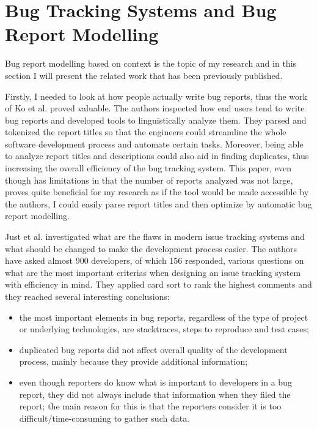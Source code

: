 \documentclass[11pt,english,twocolumn]{article}
\begin{document}
\section{Bug Tracking Systems and Bug Report Modelling}
\label{sec:bug-report}

Bug report modelling based on context is the topic of my research and in this
section I will present the related work that has been previously published.

Firstly, I needed to look at how people actually write bug reports,
thus the work of Ko et al. \cite{ko2006linguistic} proved valuable. The
authors inspected how end users tend to write bug reports and developed 
tools to linguistically analyze them. They parsed and tokenized the report
titles so that the engineers could streamline the whole software development
process and automate certain tasks. Moreover, being able to analyze
report titles and descriptions could also aid in finding duplicates, thus
increasing the overall efficiency of the bug tracking system. This paper,
even though has limitations in that the number of reports analyzed was
not large, proves quite beneficial for my research as if the tool would
be made accessible by the authors, I could easily parse report titles
and then optimize by automatic bug report modelling.

Just et al.\cite{just2008towards} investigated what are the flaws in 
modern issue tracking systems and what should be changed to make the development
process easier. The authors have asked almost 900 developers, of which
156 responded, various questions on what are the most important criterias
when designing an issue tracking system with efficiency in mind. They
applied card sort to rank the highest comments and they reached several
interesting conclusions:
  \begin{itemize}
    \item the most important elements in bug reports, regardless of the
    type of project or underlying technologies, are stacktraces, steps
    to reproduce and test cases;
    \item duplicated bug reports did not affect overall quality of the 
    development process, mainly because they provide additional information;
    \item even though reporters do know what is important to developers
    in a bug report, they did not always include that information when
    they filed the report; the main reason for this is that the reporters
    consider it is too difficult/time-consuming to gather such data.
  \end{itemize}
\end{document}
